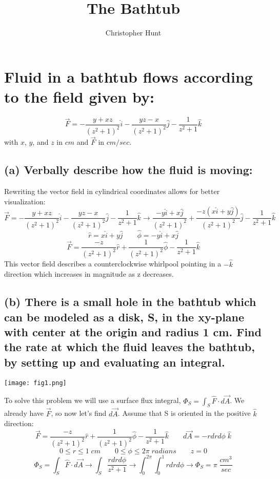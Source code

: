 \documentclass[11pt]{article}
\title{The Bathtub}
\author{Christopher Hunt}
\date{}
\begin{document}
\pagestyle{fancy}
\fancyhf{}
\rhead{\thepage}
\maketitle
\section*{Fluid in a bathtub flows according to the field given by:}
$$\vec{F}=-\frac{y+xz}{(z^2+1)^2}\hat{i}-\frac{yz-x}{(z^2+1)^2}\hat{j}-\frac{1}{z^2+1}\hat{k}$$
with $x$, $y$, and $z$ in $cm$ and $\vec{F}$ in $cm/sec$.
\subsection*{(a) Verbally describe how the fluid is moving:}

Rewriting the vector field in cylindrical coordinates allows for better visualization:
$$\vec{F}=-\frac{y+xz}{(z^2+1)^2}\hat{i}-\frac{yz-x}{(z^2+1)^2}\hat{j}-\frac{1}{z^2+1}\hat{k} \rightarrow \frac{-y\hat{i}+x\hat{j}}{(z^2+1)^2}+\frac{-z(x\hat{i}+y\hat{j})}{(z^2+1)^2}\hat{j}-\frac{1}{z^2+1}\hat{k}$$
$$\hat{r} = x\hat{i}+y\hat{j} \qquad \hat{\phi}=-y\hat{i}+x\hat{j}$$
$$\vec{F}=\frac{-z}{(z^2+1)^2}\hat{r}+\frac{1}{(z^2+1)^2}\hat{\phi}-\frac{1}{z^2+1}\hat{k}$$
This vector field describes a counterclockwise whirlpool pointing in a $-\hat{k}$ direction which increases in magnitude as z decreases.

\subsection*{(b) There is a small hole in the bathtub which can be modeled as a disk, S, in the xy-plane with center
at the origin and radius 1 cm. Find the rate at which the fluid leaves the bathtub, by setting up and evaluating an integral.}
\begin{center}
    \texttt{[image: fig1.png]}
\end{center}
To solve this problem we will use a surface flux integral, $\Phi_S = \int_S \hat{F} \cdot d\vec{A}$. We already have $\vec{F}$, so now let's find $d\vec{A}$.
Assume that S is oriented in the positive $\hat{k}$ direction:
$$\vec{F}=\frac{-z}{(z^2+1)^2}\hat{r}+\frac{1}{(z^2+1)^2}\hat{\phi}-\frac{1}{z^2+1}\hat{k} \qquad d\vec{A} = -rdrd\phi \;\hat{k} $$
$$ 0 \leq r \leq 1 \;cm \qquad 0 \leq \phi \leq 2\pi \;radians \qquad z = 0$$
$$\Phi_S = \int_S \hat{F} \cdot d\vec{A} \rightarrow \int_S \frac{rdrd\phi}{z^2+1} \rightarrow \int_0^{2\pi}\int_0^1 rdrd\phi \rightarrow \Phi_S=\pi\;\frac{cm^3}{sec}$$
\end{document}
